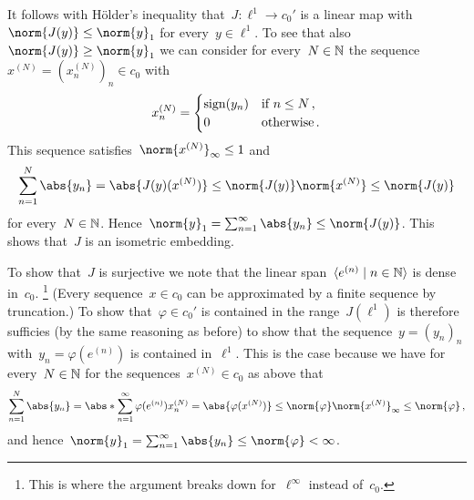 It follows with Hölder’s inequality that~$J \colon \ell^1 \to c_0'$ is a {\welldef} linear map with~$\norm{J(y)} \leq \norm{y}_1$ for every~$y \in \ell^1$.
To see that also~$\norm{J(y)} \geq \norm{y}_1$ we can consider for every~$N \in \mathbb{N}$ the sequence~$x^{(N)} = (x^{(N)}_n)_n \in c_0$ with
\[
    x^{(N)}_n
  = \begin{cases}
      \operatorname{sign}(y_n)  & \text{if~$n \leq N$}  \,, \\
      0           & \text{otherwise}      \,.
    \end{cases}
\]
This sequence satisfies~$\norm{x^{(N)}}_\infty \leq 1$ and
\[
        \sum_{n=1}^N \abs{y_n}
  =     \abs{ J(y)(x^{(N)}) }
  \leq  \norm{J(y)} \norm{x^{(N)}}
  \leq  \norm{J(y)}
\]
for every~$N \in \mathbb{N}$.
Hence~$\norm{y}_1 = \sum_{n=1}^\infty \abs{y_n} \leq \norm{J(y)}$.
This shows that~$J$ is an isometric embedding.

To show that~$J$ is surjective we note that the linear span~$\gen{e^{(n)} \suchthat n \in \Natural}$ is dense in~$c_0$.%
\footnote{This is where the argument breaks down for~$\ell^\infty$ instead of~$c_0$.}
(Every sequence~$x \in c_0$ can be approximated by a finite sequence by truncation.)
To show that~$\varphi \in c_0'$ is contained in the range~$J(\ell^1)$ is therefore sufficies (by the same reasoning as before) to show that the sequence~$y = (y_n)_n$ with~$y_n = \varphi(e^{(n)})$ is contained in~$\ell^1$.
This is the case because we have for every~$N \in \mathbb{N}$ for the sequences~$x^{(N)} \in c_0$ as above that
\[
        \sum_{n=1}^N \abs{y_n}
  =     \abs*{ \sum_{n=1}^\infty \varphi(e^{(n)}) x^{(N)}_n }
  =     \abs{ \varphi(x^{(N)}) }
  \leq  \norm{\varphi} \norm{x^{(N)}}_\infty
  \leq  \norm{\varphi} \,,
\]
and hence~$\norm{y}_1 = \sum_{n=1}^\infty \abs{y_n} \leq \norm{\varphi} < \infty$.




